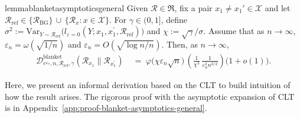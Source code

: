 \documentclass{article}
\theoremstyle{plain}
\theoremstyle{definition}
\begin{document}
\begin{restatable}{lemma}{blanketasymptoticsgeneral}
\label{lem:blanket-asymptotics-general}
Given $\mathcal{R}\in \mathfrak{R}$, fix a pair $x_1\neq x_1'\in\mathcal X$ and let
$
  \mathcal R_{\mathrm{ref}}
  \in
  \bigl\{\mathcal R_{\mathrm{BG}}\bigr\}
  \,\cup\,
  \bigl\{\mathcal R_x : x\in\mathcal X\bigr\}.
$
For $\gamma\in(0,1]$, define
$
  \sigma^2
  := \mathrm{Var}_{Y\sim\mathcal{R}_{\mathrm{ref}}}\bigl(l_{\varepsilon=0}(Y;x_1, x_1^\prime,\mathcal{R}_{\mathrm{ref}})\bigr)
$
and
$
  \chi := \sqrt{\gamma}/{\sigma}.
$
Assume that as $n\to\infty$,
$
  \varepsilon_n = \omega(\sqrt{1/n})
$
and
$
  \varepsilon_n = O\!\left(\sqrt{\log n / n}\right).
$
Then, as $n\to\infty$,
\begin{align}
  \label{eq:blanket-asymptotics-general}
  \mathcal D^{\mathrm{blanket}}_{e^{\varepsilon_n},n,\mathcal R_{\mathrm{ref}},\gamma}(\mathcal{R}_{x_1} \| \mathcal{R}_{x_1^\prime})
  &\;=\;
  \varphi\bigl(\chi\varepsilon_n\sqrt{n}\bigr)\,
  \left(
    \frac{1}{\chi^3}\,
    \frac{1}{\varepsilon_n^2 n^{3/2}}
  \right)\bigl(1+o(1)\bigr).
\end{align}
\end{restatable}
Here, we present an informal derivation based on the CLT to build intuition of how the result arises. 
The rigorous proof with the asymptotic expansion of CLT~\cite{slastnikovLimitTheoremsModerate1979,angstWeakCramerCondition2017,petrovSumsIndependentRandom1975} is in Appendix~\ref{app:proof-blanket-asymptotics-general}.
\end{document}

